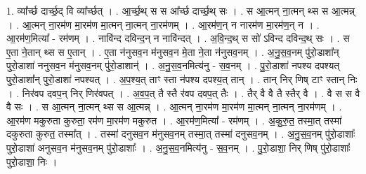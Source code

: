 \documentclass[17pt]{extarticle}
\begin{document}
1. व्या᳚र्च्छ दार्च्छ॒द् वि व्या᳚र्च्छत् । . आ॒र्च्छ॒थ् स स आ᳚र्च्छ दार्च्छ॒थ् सः । . स आ॒त्मन् ना॒त्मन् थ्स स आ॒त्मन्न् । . आ॒त्मन् ना॒रम॑ण मा॒रम॑ण मा॒त्मन् ना॒त्मन् ना॒रम॑णम् । . आ॒रम॑ण॒न् न नारम॑ण मा॒रम॑ण॒न् न । . आ॒रम॑ण॒मित्या᳚ - रम॑णम् । . नावि॑न्द दविन्द॒न् न नावि॑न्दत् । . अ॒वि॒न्द॒थ् स सो॑ ऽविन्द दविन्द॒थ् सः । . स ए॒ता ने॒तान् थ्स स ए॒तान् । . ए॒ता न॑नुसव॒न म॑नुसव॒न मे॒ता ने॒ता न॑नुसव॒नम् । . अ॒नु॒स॒व॒नम् पु॑रो॒डाशा᳚न् पुरो॒डाशा॑ ननुसव॒न म॑नुसव॒नम् पु॑रो॒डाशान्॑ । . अ॒नु॒स॒व॒नमित्य॑नु - स॒व॒नम् । . पु॒रो॒डाशा॑ नपश्य दपश्यत् पुरो॒डाशा᳚न् पुरो॒डाशा॑ नपश्यत् । . अ॒प॒श्य॒त् ताꣳ स्ता न॑पश्य दपश्य॒त् तान् । . तान् निर् णिष् टाꣳ स्तान् निः । . निर॑वप दवप॒न् निर् णिर॑वपत् । . अ॒व॒प॒त् तै स्तै र॑वप दवप॒त् तैः । . तैर् वै वै तै स्तैर् वै । . वै स स वै वै सः । . स आ॒त्मन् ना॒त्मन् थ्स स आ॒त्मन्न् । . आ॒त्मन् ना॒रम॑ण मा॒रम॑ण मा॒त्मन् ना॒त्मन् ना॒रम॑णम् । . आ॒रम॑ण मकुरुता कुरुता॒ रम॑ण मा॒रम॑ण मकुरुत । . आ॒रम॑ण॒मित्या᳚ - रम॑णम् । . अ॒कु॒रु॒त॒ तस्मा॒त् तस्मा॑ दकुरुता कुरुत॒ तस्मा᳚त् । . तस्मा॑ दनुसव॒न म॑नुसव॒नम् तस्मा॒त् तस्मा॑ दनुसव॒नम् । . अ॒नु॒स॒व॒नम् पु॑रो॒डाशाः᳚ पुरो॒डाशा॑ अनुसव॒न म॑नुसव॒नम् पु॑रो॒डाशाः᳚ । . अ॒नु॒स॒व॒नमित्य॑नु - स॒व॒नम् । . पु॒रो॒डाशा॒ निर् णिष् पु॑रो॒डाशाः᳚ पुरो॒डाशा॒ निः । \newline
\end{document}
